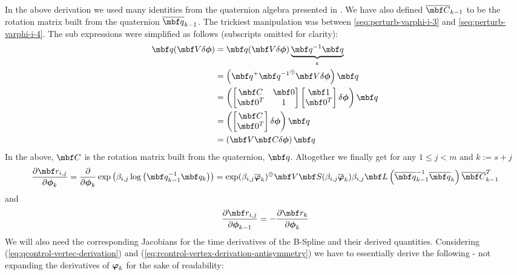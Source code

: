 \documentclass[11pt,a4paper,oneside]{article}
\begin{document}
In the above derivation we used many identities from the quaternion algebra presented in \citet{Barfoot1100}. We have also defined $\mbfbar C_{k-1}$ to be the rotation matrix built from the quaternion $\mbfbar q_{k-1}$. The trickiest manipulation was between \eqref{seq:perturb-varphi-i-3} and \eqref{seq:perturb-varphi-i-4}. The sub expressions were simplified as follows (subscripts omitted for clarity):
\begin{subequations}
	\begin{flalign}
		\mbf q(\mbf V \mbsdel \phi) &= \mbf q(\mbf V \mbsdel \phi) \underbrace{{\mbf q^{-1}} \mbf q}_{\mbs \iota}\\
		&= \left(\mbf q^+{\mbf q^{-1}}^{\oplus}\mbf V \mbsdel \phi\right) \mbf q\\ 
		&= \left(\bbm \mbf C & \mbf 0 \\ \mbf 0^T & 1 \ebm \bbm \mbf 1 \\ \mbf 0^T \ebm \mbsdel \phi\right)\mbf q\\
		&= \left(\bbm \mbf C  \\ \mbf 0^T \ebm  \mbsdel \phi\right)\mbf q\\
		&= \left(\mbf V  \mbf C \mbsdel \phi\right)\mbf q
	\end{flalign}
\end{subequations}
In the above, 
$\mbf C$ is the rotation matrix built from the quaternion, $\mbf q$. 
Altogether we finally get for any $1 \leq j < m$ and $k:=s + j$
\begin{equation}
	\frac{\partial \mbf r_{i, j}}{\partial \mbs\phi_k} = \frac{\partial}{\partial \mbs\phi_k} \exp\left( \beta_{i, j} \log\left({\mbf q_{k-1}^{-1}}\mbf q_k \right) \right)
	= \exp(\beta_{i, j}\mbsbar \varphi_{k})^\oplus \mbf  V\mbf S(\beta_{i, j}\mbsbar \varphi_{k}) \beta_{i, j} \mbf L\left({\mbfbar q_{k-1}^{-1}}\mbfbar q_k\right) \mbfbar C_{k-1}^T
\end{equation}
and
\begin{equation}\label{eq:rcontrol-vertex-derivation-antisymmetry}
  \frac{\partial \mbf r_{i, j}}{\partial \mbs \phi_{k - 1}} = -\frac{\partial \mbf r_k}{\partial \mbs \phi_k} 
\end{equation}
We will also need the corresponding Jacobians for the time derivatives of the B-Spline and their derived quantities. Considering (\ref{eq:qcontrol-vertec-derivation}) and (\ref{eq:rcontrol-vertex-derivation-antisymmetry}) we have to essentially derive the following - not expanding the derivatives of ${\boldsymbol{\varphi}}_k$ for the sake of readability:
\end{document}
